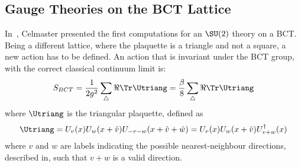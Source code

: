 \subsection{Gauge Theories on the BCT Lattice}
In~\cite{Celmaster:1982ht}, Celmaster presented the first computations for an $\SU(2)$ theory on a BCT.
Being a different lattice, where the plaquette is a triangle and not a square, a new action has to be defined. An action that is invariant under the BCT group, with the correct classical continuum limit is:
\begin{equation}
    S_{BCT} = \frac1{2g^2} \sum_\bigtriangleup \Re\Tr \Utriang = \frac\beta8 \sum_\bigtriangleup \Re\Tr \Utriang \label{3:BCTAction}
\end{equation}
where $\Utriang$ is the triangular plaquette, defined as
\begin{equation}
    \Utriang = U_v(x)U_w(x+\hat{v})U_{-v-w}(x+\hat{v}+\hat{w}) = U_v(x)U_w(x+\hat{v})U^\dagger_{v+w}(x) \label{3:PlaqTriang}
\end{equation}
where $v$ and $w$ are labels indicating the possible nearest-neighbour directions, described in, such that $v+w$ is a valid direction.
\begin{comment}
\begin{figure}[!hbtp]
    \centering
    \begin{tikzpicture}
        \filldraw[black]  (0,0) circle (3pt) node[anchor=north east]{$x$};
        \filldraw[black]  (2,0) circle (3pt) node[anchor=north west]{$x+\hat{v}$};
        \filldraw[black]  (1,1.732) circle (3pt) node[anchor=south]{$x+\hat{v}+\hat{w}$};
        \draw[ultra thick,->] (0,0) -- (1,0) node[anchor=north]{$U_v(x)$};
        \draw[ultra thick   ] (1,0) -- (2,0);
        \draw[ultra thick,->] (2,0) -- (1.5,0.866) node[anchor=south west]{$U_w(x+\hat{v})$};
        \draw[ultra thick   ] (1.5,0.866) -- (1,1.732);
        \draw[ultra thick,->] (1,1.732) -- (0.5,0.866) node[anchor=south east]{$U^\dagger_{v+w}(x)$};
        \draw[ultra thick   ] (0.5,0.866) -- (0,0);
    \end{tikzpicture}
    \caption{Schematization of an elementary triangular plaquette.}
    \label{3F:PlaqTriang}
\end{figure}\\
\end{comment}
